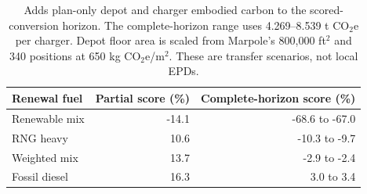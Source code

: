 \begin{table}[htbp]
\centering
\begin{tabular}{@{}lrr@{}}
\toprule
Renewal fuel & Partial score (\%) & Complete-horizon score (\%)\\
\midrule
Renewable mix & -14.1 & -68.6 to -67.0\\
RNG heavy & 10.6 & -10.3 to -9.7\\
Weighted mix & 13.7 & -2.9 to -2.4\\
Fossil diesel & 16.3 & 3.0 to 3.4\\
\bottomrule
\end{tabular}
\caption{Adds plan-only depot and charger embodied carbon to the scored-conversion horizon. The complete-horizon range uses 4.269--8.539 t CO$_2$e per charger. Depot floor area is scaled from Marpole's 800,000 ft$^2$ and 340 positions at 650 kg CO$_2$e/m$^2$. These are transfer scenarios, not local EPDs.}
\label{tab:environment_bridge}
\end{table}
